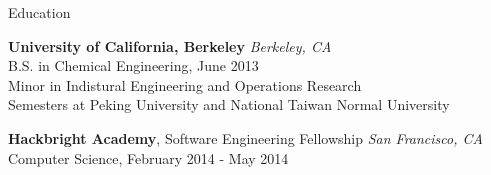 \documentclass{resume} %
\begin{document}
\begin{rSection}{Education}

{\bf University of California, Berkeley} \hfill {\em Berkeley, CA} \\
B.S. in Chemical Engineering, June 2013 \\
Minor in Indistural Engineering and Operations Research \\
Semesters at Peking University and National Taiwan Normal University \smallskip


{\bf Hackbright Academy}, Software Engineering Fellowship \hfill {\em San Francisco, CA} \\
Computer Science, February 2014 - May 2014 \smallskip


\end{rSection}






\end{document}

